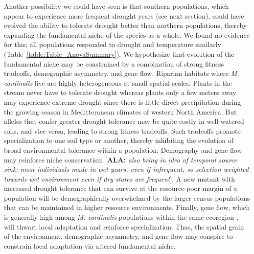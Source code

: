 \documentclass[11pt, oneside]{article}
\newcommand{\ala}[1]{{ \color{blue} [{\bf{ALA:}} {\em#1}]}} %
\begin{document}
Another possibility we could have seen is that southern populations, which appear to experience more frequent drought years (see next section), could have evolved the ability to tolerate drought better than northern populations, thereby expanding the fundamental niche of the species as a whole. We found no evidence for this; all populations responded to drought and temperature similarly (Table~\ref{table:Table_AnovaSummary}). We hypothesize that evolution of the fundamental niche may be constrained by a combination of strong fitness tradeoffs, demographic asymmetry, and gene flow. Riparian habitats where \textit{M. cardinalis} live are highly heterogeneous at small spatial scales. Plants in the stream never have to tolerate drought whereas plants only a few meters away may experience extreme drought since there is little direct precipitation during the growing season in Meditteranean climates of western North America. But alleles that confer greater drought tolerance may be quite costly in well-watered soils, and vice versa, leading to strong fitness tradeoffs. Such tradeoffs promote specialization to one soil type or another, thereby inhibiting the evolution of broad environmental tolerance within a population. Demography and gene flow may reinforce niche conservatism \ala{also bring in idea of temporal source sink: most individuals made in wet years, even if infrequent, so selection weighted towards wet environment even if dry states are frequent}. A new mutant with increased drought tolerance that can survive at the resource-poor margin of a population will be demographically overwhelmed by the larger census populations that can be maintained in higher resource environments. Finally, gene flow, which is generally high among \textit{M. cardinalis} populations within the same ecoregion \citep{Paul_etal_2016}, will thwart local adaptation and reinforce specialization. Thus, the spatial grain of the environment, demographic asymmetry, and gene flow may conspire to constrain local adaptation via altered fundamental niche.
\end{document}
